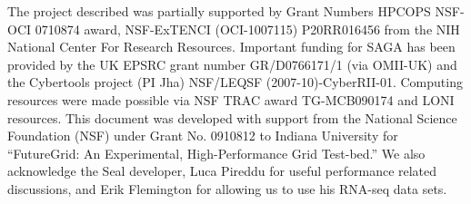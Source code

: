 \documentclass{acm_proc_article-sp}
\begin{document}
The project described was partially supported by Grant Numbers HPCOPS
NSF-OCI 0710874 award, NSF-ExTENCI (OCI-1007115) P20RR016456 from the
NIH National Center For Research Resources.  Important funding for
SAGA has been provided by the UK EPSRC grant number GR/D0766171/1 (via
OMII-UK) and the Cybertools project (PI Jha) NSF/LEQSF
(2007-10)-CyberRII-01.  Computing resources were made possible via NSF
TRAC award TG-MCB090174 and LONI resources.  This document was
developed with support from the National Science Foundation (NSF)
under Grant No.  0910812 to Indiana University for ``FutureGrid: An
Experimental, High-Performance Grid Test-bed.''  We also acknowledge
the Seal developer, Luca Pireddu for useful performance related
discussions, and Erik Flemington for allowing us to use his RNA-seq
data sets.



\end{document}
